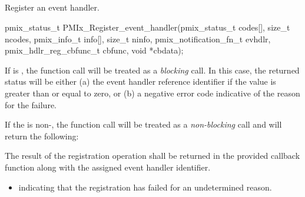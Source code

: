 \subsection{}

\summary

Register an event handler.

\format

\cspecificstart
\begin{codepar}
pmix_status_t
PMIx_Register_event_handler(pmix_status_t codes[], size_t ncodes,
                            pmix_info_t info[], size_t ninfo,
                            pmix_notification_fn_t evhdlr,
                            pmix_hdlr_reg_cbfunc_t cbfunc,
                            void *cbdata);
\end{codepar}
\cspecificend

\begin{arglist}
\end{arglist}


If  is , the function call will be treated as a \emph{blocking} call. In this case, the returned status will be either (a) the event handler reference identifier if the value is greater than or equal to zero, or (b) a negative error code indicative of the reason for the failure.

If the  is non-, the function call will be treated as a \emph{non-blocking} call and will return the following:

\returnsimplenb
The result of the registration operation shall be returned in the provided callback function along with the assigned event handler identifier.

\returnstart
\begin{itemize}
\item {} indicating that the registration
has failed for an undetermined reason.
\end{itemize}
\returnend


